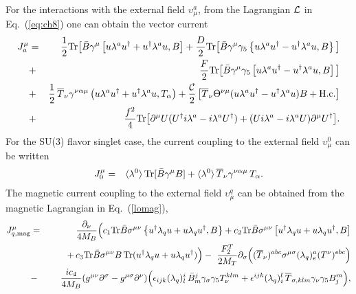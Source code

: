\documentclass[preprintnumbers,prd,superscriptaddress,preprint]{revtex4-1}
\begin{document}
%
For the interactions with the external field $\upsilon_\mu^a$, from the Lagrangian $\cal L$ in Eq.~(\ref{eq:ch8}) one can obtain the vector current 
%
\begin{eqnarray}
J^\mu_a
&=& \frac12 {\rm Tr}
   \big[
   \bar B \gamma^\mu
   \left[ u \lambda^a u^\dagger + u^\dagger \lambda^a u, B
   \right]	
      + \frac{D}{2}{\rm Tr}
   \big[
   \bar B \gamma^\mu \gamma_5
   \left\{ u \lambda^a u^\dagger - u^\dagger \lambda^a u, B
   \right\}
   \big]						\notag\\
&+& \frac{F}{2}{\rm Tr}
   \big[
   \bar B \gamma^\mu \gamma_5
   \left[ u \lambda^a u^\dagger - u^\dagger \lambda^a u, B
   \right]
   \big]						\notag\\
&+& \frac12\,
   \overline{T}_\nu \gamma^{\nu\alpha\mu}
   \left( u \lambda^a u^\dagger + u^\dagger \lambda^a u, T_\alpha
   \right)
   + \frac{\cal C}{2}
   \left[
   \overline{T}_\nu \Theta^{\nu\mu}
   (u \lambda^a u^\dagger - u^\dagger \lambda^a u) B
   + {\rm H.c.}
   \right]						\notag\\
&+& \frac{f^2}{4}{\rm Tr}
   \big[
   \partial^\mu U
   (U^\dagger i \lambda^a
    - i \lambda^a U^\dagger)
+  (U i \lambda^a
    - i \lambda^a U)
   \partial^\mu U^\dagger
   \big].
\label{eq:ch1}
\end{eqnarray}
%
For the SU(3) flavor singlet case, the current coupling to the external field $\upsilon_\mu^0$ can be written
%
\begin{eqnarray}
J^\mu_0
&=& \langle \lambda^0 \rangle\,
    {\rm Tr}[\bar B \gamma^\mu B]
 +  \langle \lambda^0 \rangle\,
    \overline{T}_\nu \gamma^{\nu\alpha\mu}\, T_\alpha.
\label{eq:ch2}
\end{eqnarray}
%
The magnetic current coupling to the external field $\upsilon_\mu^q$ can be obtained from the magnetic Lagrangian in Eq.~(\ref{lomag}), %
%
\begin{eqnarray}
J_{q, \rm mag}^\mu
&=&
\frac{\partial_\nu}{4 M_B}
\Big(
  c_1 {\rm Tr}\bar{B} \sigma^{\mu\nu}
    \left\{u^\dag \lambda_q u + u \lambda_q u^\dag,B\right\}
+ c_2 {\rm Tr}\bar{B} \sigma^{\mu\nu}
    \left[u^\dag \lambda_q u + u \lambda_q u^\dag,B \right]
\nonumber \\
& & \qquad
+\, c_3 {\rm Tr}\bar{B} \sigma^{\mu\nu} B\, 
        {\rm Tr}(u^\dag \lambda_q u + u \lambda_q u^\dag)
\Big)
-\
\frac{F_2^T}{2 M_T}
\partial_\sigma
\Big( (\overline{T}_\nu)^{abc}\sigma^{\mu\sigma}(\lambda_q)^a_e (T^\nu)^{ebc}
\Big)
\nonumber \\
&-&
\frac{ic_4}{4 M_B} 
(g^{\mu\nu} \partial^\sigma - g^{\mu\sigma} \partial^\nu)
\Big( \epsilon_{ijk} 
      (\lambda_q)^i_l\, \bar{B}^j_m \gamma_\sigma \gamma_5 T_\nu^{klm}
    + \epsilon^{ijk}
      (\lambda_q)^l_i\, \overline{T}_{\sigma,klm} \gamma_\nu \gamma_5 B^m_j
\Big),
\end{eqnarray}
\end{document}
